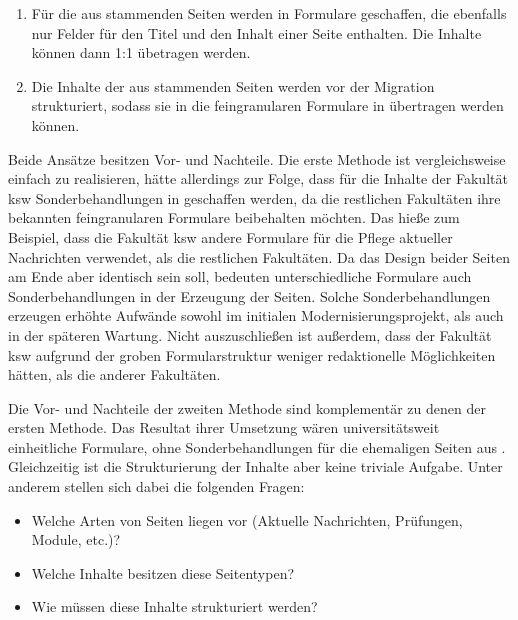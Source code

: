         \begin{enumerate}
            \item   Für die aus \wordpress stammenden Seiten werden in \imperia Formulare geschaffen,
                    die ebenfalls nur Felder für den Titel und den Inhalt einer Seite enthalten.
                    Die Inhalte können dann 1:1 übetragen werden.
            \item   Die Inhalte der aus \wordpress stammenden Seiten werden vor der Migration strukturiert,
                    sodass sie in die feingranularen Formulare in \imperia übertragen werden können.
        \end{enumerate}

        Beide Ansätze besitzen Vor- und Nachteile.
        Die erste Methode ist vergleichsweise einfach zu realisieren,
        hätte allerdings zur Folge, dass für die Inhalte der Fakultät \gls{ksw} Sonderbehandlungen
        in \imperia geschaffen werden, da die restlichen Fakultäten ihre bekannten feingranularen
        Formulare beibehalten möchten.
        Das hieße zum Beispiel, dass die Fakultät \gls{ksw} andere Formulare für die Pflege aktueller
        Nachrichten verwendet, als die restlichen Fakultäten.
        Da das Design beider Seiten am Ende aber identisch sein soll, bedeuten unterschiedliche Formulare
        auch Sonderbehandlungen in der Erzeugung der Seiten.
        Solche Sonderbehandlungen erzeugen erhöhte Aufwände sowohl im initialen Modernisierungsprojekt,
        als auch in der späteren Wartung.
        Nicht auszuschließen ist außerdem, dass \editors der Fakultät \gls{ksw} aufgrund der groben Formularstruktur
        weniger redaktionelle Möglichkeiten hätten, als die anderer Fakultäten.

        Die Vor- und Nachteile der zweiten Methode sind komplementär zu denen der ersten Methode.
        Das Resultat ihrer Umsetzung wären universitätsweit einheitliche Formulare,
        ohne Sonderbehandlungen für die ehemaligen Seiten aus \wordpress.
        Gleichzeitig ist die Strukturierung der Inhalte aber keine triviale Aufgabe.
        Unter anderem stellen sich dabei die folgenden Fragen:

        \begin{itemize}
            \item Welche Arten von Seiten liegen vor (Aktuelle Nachrichten, Prüfungen, Module, etc.)?
            \item Welche Inhalte besitzen diese Seitentypen?
            \item Wie müssen diese Inhalte strukturiert werden?
        \end{itemize}

